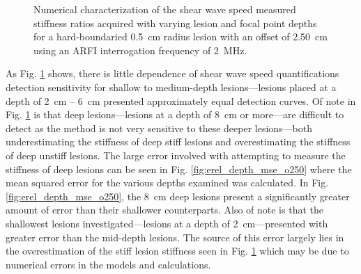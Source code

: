 			\begin{figure}[!htb]
				\centering
				\caption[Numerical characterization of shear wave speed measured stiffness ratio with changing lesion depth]{Numerical characterization of the shear wave speed measured stiffness ratios acquired with varying lesion and focal point depths for a hard-boundaried \SI{0.5}{cm} radius lesion with an offset of \SI{2.50}{\cm} using an ARFI interrogation frequency of \SI{2}{\MHz}.}
				\label{fig:erel_depth_o250}
			\end{figure}

			As Fig. \ref{fig:erel_depth_o250} shows, there is little dependence of shear wave speed quantifications detection sensitivity for shallow to medium-depth lesions---lesions placed at a depth of \SI{2}{\cm} -- \SI{6}{\cm} presented approximately equal detection curves. Of note in Fig. \ref{fig:erel_depth_o250} is that deep lesions---lesions at a depth of \SI{8}{\cm} or more---are difficult to detect as the method is not very sensitive to these deeper lesions---both underestimating the stiffness of deep stiff lesions and overestimating the stiffness of deep unstiff lesions. The large error involved with attempting to measure the stiffness of deep lesions can be seen in Fig. \ref{fig:erel_depth_mse_o250} where the mean squared error for the various depths examined was calculated. In Fig. \ref{fig:erel_depth_mse_o250}, the \SI{8}{\cm} deep lesions present a significantly greater amount of error than their shallower counterparts. Also of note is that the shallowest lesions investigated---lesions at a depth of \SI{2}{\cm}---presented with greater error than the mid-depth lesions. The source of this error largely lies in the overestimation of the stiff lesion stiffness seen in Fig. \ref{fig:erel_depth_o250} which may be due to numerical errors in the models and calculations.

